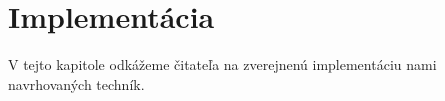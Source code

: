 \chapter{Implementácia}

\label{kap:implementacia}

V tejto kapitole odkážeme čitateľa na zverejnenú implementáciu
nami navrhovaných techník.
